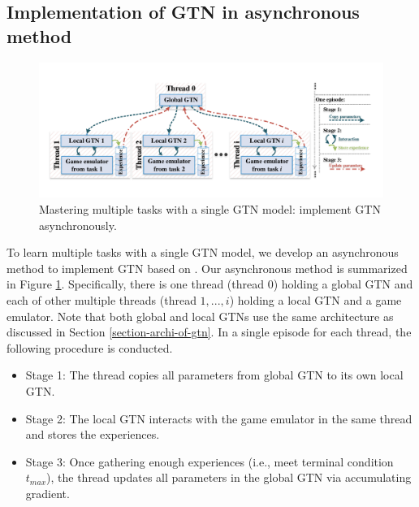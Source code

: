 \documentclass[letterpaper]{article} %
\begin{document}
\subsection{Implementation of GTN in asynchronous method}
\label{section-asyn-mtrl-framework}

\begin{figure}
	\begin{center}
		\centerline{\includegraphics[width=\columnwidth]{figure/figure-asyn-mtrl-framework}}
		\caption{Mastering multiple tasks with a single GTN model: implement GTN asynchronously.}
		\label{figure-asyn-mtrl-framework}
	\end{center}
\end{figure}

To learn multiple tasks with a single GTN model, we develop an asynchronous method to implement GTN based on \cite{mnih2016asynchronous}.
Our asynchronous method is summarized in Figure \ref{figure-asyn-mtrl-framework}.
Specifically, there is one thread (thread $0$) holding a global GTN and each of other multiple threads (thread $1,..., i$) holding a local GTN and a game emulator.
Note that both global and local GTNs use the same architecture as discussed in Section \ref{section-archi-of-gtn}.
In a single episode for each thread, the following procedure is conducted.
\begin{itemize}
    \item  Stage 1: The thread copies all parameters from global GTN to its own local GTN.
    \item  Stage 2:  The local GTN interacts with the game emulator in the same thread and stores the experiences.
    \item  Stage 3:  Once gathering enough experiences (i.e., meet terminal condition $t_{max}$), the thread updates all parameters in the global GTN via accumulating gradient.
\end{itemize}
\end{document}
